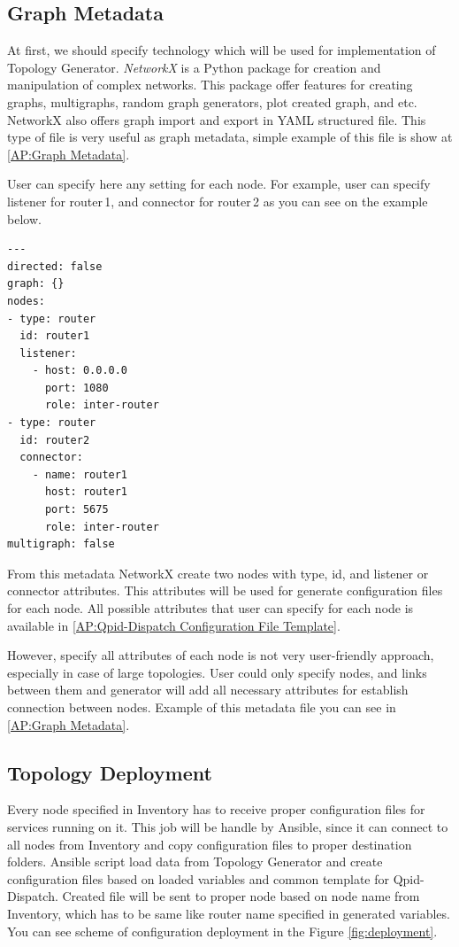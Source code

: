 
\subsection{Graph Metadata}
\label{Graph Metadata}
At first, we should specify technology which will be used for implementation of Topology Generator. \emph{NetworkX} is a Python package for creation and manipulation of complex networks. This package offer features for creating graphs, multigraphs, random graph generators, plot created graph, and etc. NetworkX also offers graph import and export in YAML structured file. This type of file is very useful as graph metadata, simple example of this file is show at \ref{AP:Graph Metadata}.

User can specify here any setting for each node. For example, user can specify listener for router\,1, and connector for router\,2 as you can see on the example below.

\begin{verbatim}
---
directed: false
graph: {}
nodes:
- type: router					
  id: router1
  listener:
  	- host: 0.0.0.0
  	  port: 1080 	
  	  role: inter-router
- type: router					
  id: router2
  connector:
  	- name: router1
  	  host: router1
  	  port: 5675 	
  	  role: inter-router  
multigraph: false	  
\end{verbatim}
From this metadata NetworkX create two nodes with type, id, and listener or connector attributes. This attributes will be used for generate configuration files for each node. All possible attributes that user can specify for each node is available in \ref{AP:Qpid-Dispatch Configuration File Template}.

However, specify all attributes of each node is not very user-friendly approach, especially in case of large topologies. User could only specify nodes, and links between them and generator will add all necessary attributes for establish connection between nodes. Example of this metadata file you can see in \ref{AP:Graph Metadata}.

\subsection{Topology Deployment}
Every node specified in Inventory has to receive proper configuration files for services running on it. This job will be handle by Ansible, since it can connect to all nodes from Inventory and copy configuration files to proper destination folders. Ansible script load data from Topology Generator and create configuration files based on loaded variables and common template for Qpid-Dispatch. Created file will be sent to proper node based on node name from Inventory, which has to be same like router name specified in generated variables. You can see scheme of configuration deployment in the Figure \ref{fig:deployment}.

